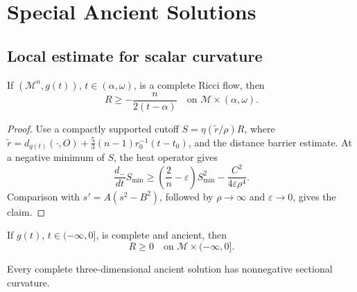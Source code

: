 \chapter[28]{Special Ancient Solutions}
\label{ch:chow-iv-special-ancient-solutions}

\section{Local estimate for scalar curvature}

\begin{theorem}
\label{thm:chow-iv-sharp-lower-scalar}

If \((\mathcal M^n,g(t))\), \(t\in(\alpha,\omega)\), is a complete Ricci
flow, then
\[
 R\ge -\frac{n}{2(t-\alpha)}\quad\text{on }\mathcal M\times(\alpha,\omega).
\]
\end{theorem}
\begin{proof}
\sketch
Use a compactly supported cutoff \(S=\eta(\widetilde r/\rho)R\), where
\(\widetilde r=d_{g(t)}(\mathord\cdot,O)+\frac53(n-1)r_0^{-1}(t-t_0)\),
and the distance barrier estimate.  At a negative minimum of \(S\), the heat
operator gives
\[
 \frac{d_-}{dt}S_{\min}\ge
 \left(\frac2n-\varepsilon\right)S_{\min}^2-
 \frac{C^2}{4\varepsilon\rho^4}.
\]
Comparison with \(s'=A(s^2-B^2)\), followed by \(\rho\to\infty\) and
\(\varepsilon\to0\), gives the claim.
\end{proof}

\begin{corollary}
\label{cor:chow-iv-ancient-nonnegative-scalar}


If \(g(t)\), \(t\in(-\infty,0]\), is complete and ancient, then
\[
R\ge0\quad\text{on }\mathcal M\times(-\infty,0].
\]
\end{corollary}

\begin{theorem}
\label{thm:chow-iv-ancient-3d-sectional}

Every complete three-dimensional ancient solution has nonnegative sectional
curvature.
\end{theorem}

